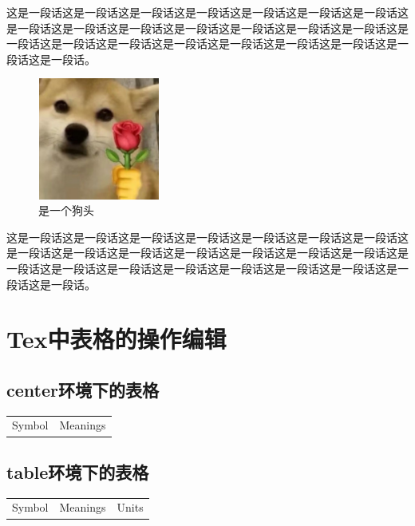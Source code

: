 \documentclass[normalsize]{article}   %
\begin{document}
		\newpage
		这是一段话这是一段话这是一段话这是一段话这是一段话这是一段话这是一段话这是一段话这是一段话这是一段话这是一段话这是一段话这是一段话这是一段话这是一段话这是一段话这是一段话这是一段话这是一段话这是一段话这是一段话这是一段话这是一段话。
			\begin{figure}[htbp!]
			\centering
			\includegraphics[height=4cm,width=4cm]{./img/sample.png}%
			\caption{是一个狗头}
			\label{fig:10}
		\end{figure}
	这是一段话这是一段话这是一段话这是一段话这是一段话这是一段话这是一段话这是一段话这是一段话这是一段话这是一段话这是一段话这是一段话这是一段话这是一段话这是一段话这是一段话这是一段话这是一段话这是一段话这是一段话这是一段话这是一段话。
		\newpage
	\section{Tex中表格的操作编辑}
	\subsection{center环境下的表格}
		\begin{center}
			\begin{tabular}{cc}
				\hline
				\makebox[0.45\textwidth][c]{符号}	& \makebox[0.45\textwidth][c]{意义}   \\ \hline
				Symbol  & Meanings \\ \hline
			\end{tabular}
		\end{center}
	\subsection{table环境下的表格}
		\begin{table}[htbp!]
			\begin{tabular}{ccc}
				\hline
				\makebox[0.25\textwidth][c]{符号}	& \makebox[0.35\textwidth][c]{意义} & \makebox[0.2\textwidth][c]{单位}	 \\ \hline
				Symbol  & Meanings & Units\\ \hline
			\end{tabular}
		\end{table}
\end{document}
